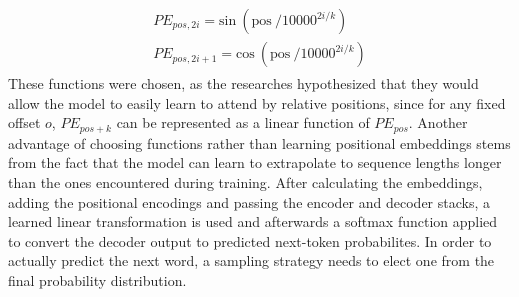 \begin{align}
	\begin{split}
		PE_{pos, 2i} = \text{sin} \ \left( \text{pos} \ / 10000^{2i / k} \right) \\
		PE_{pos, 2i + 1} = \text{cos} \ \left( \text{pos} \ / 10000^{2i / k} \right)
	\end{split}
\end{align}
These functions were chosen, as the researches hypothesized that they would allow the model to easily learn to attend by relative positions, since for any fixed offset $ o $, $ PE_{pos + k} $ can be represented as a linear function of $ PE_{pos} $. Another advantage of choosing functions rather than learning positional embeddings stems from the fact that the model can learn to extrapolate to sequence lengths longer than the  ones encountered during training. After calculating the embeddings, adding the positional encodings and passing the encoder and decoder stacks, a learned linear transformation is used and afterwards a softmax function applied to convert the decoder output to predicted next-token probabilites. In order to actually predict the next word, a sampling strategy needs to elect one from the final probability distribution.

